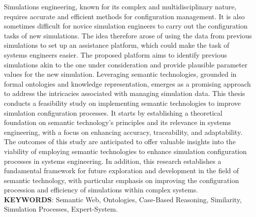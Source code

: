 Simulations engineering, known for its complex and multidisciplinary nature, requires accurate and efficient methods for configuration management. It is also sometimes difficult for novice simulation engineers to carry out the configuration tasks of new simulations. The idea therefore arose of using the data from previous simulations to set up an assistance platform, which could make the task of systems engineers easier. The proposed platform aims to identify previous simulations akin to the one under consideration and provide plausible parameter values for the new simulation. Leveraging semantic technologies, grounded in formal ontologies and knowledge representation, emerges as a promising approach to address the intricacies associated with managing simulation data. This thesis conducts a feasibility study on implementing semantic technologies to improve simulation configuration processes. It starts by establishing a theoretical foundation on semantic technology's principles and its relevance in systems engineering, with a focus on enhancing accuracy, traceability, and adaptability. The outcomes of this study are anticipated to offer valuable insights into the viability of employing semantic technologies to enhance simulation configuration processes in systems engineering. In addition, this research establishes a fundamental framework for future exploration and development in the field of semantic technology, with particular emphasis on improving the configuration procession and efficiency of simulations within complex systems.\\

\textbf{KEYWORDS}: Semantic Web, Ontologies, Case-Based Reasoning, Similarity, Simulation Processes, Expert-System.

